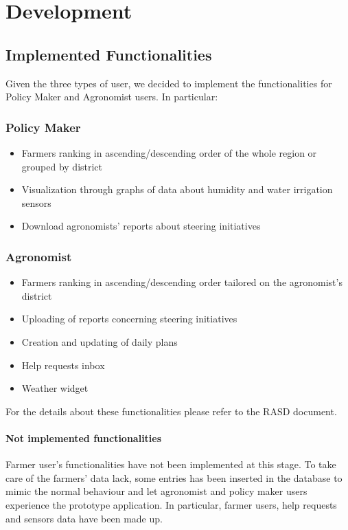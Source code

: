 \documentclass[table, 12pt]{article}
\begin{document}
\newpage
\section{Development}
\subsection{Implemented Functionalities}
Given the three types of user, we decided to implement the functionalities for Policy Maker and Agronomist users. In particular:
\subsubsection*{Policy Maker}
\begin{itemize}
    \item Farmers ranking in ascending/descending order of the whole region or grouped by district
    \item Visualization through graphs of data about humidity and water irrigation sensors
    \item Download agronomists' reports about steering initiatives
\end{itemize}
\subsubsection*{Agronomist}
\begin{itemize}
    \item Farmers ranking in ascending/descending order tailored on the agronomist's district
    \item Uploading of reports concerning steering initiatives
    \item Creation and updating of daily plans
    \item Help requests inbox
    \item Weather widget
\end{itemize}
For the details about these functionalities please refer to the RASD document.

\paragraph{Not implemented functionalities}
Farmer user's functionalities have not been implemented at this stage. To take care of the farmers' data lack, some entries has been inserted in the database to mimic the normal behaviour and let agronomist and policy maker users experience the prototype application. In particular, farmer users, help requests and sensors data have been made up.
\newpage
\end{document}
